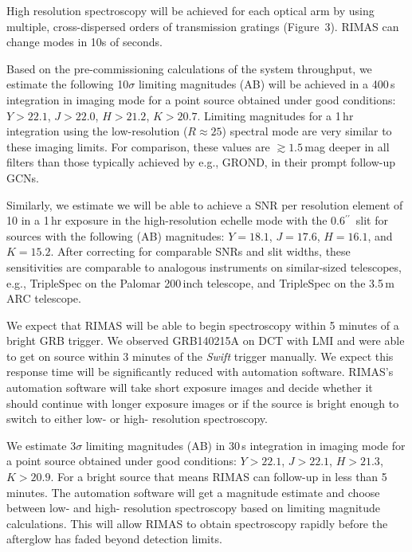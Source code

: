 \documentclass[letterpaper,11pt]{article}
\newcommand{\arcsec}{\mbox{$^{\prime\prime}$}}%
\begin{document}
High resolution spectroscopy will be achieved for each optical arm by using 
multiple, cross-dispersed orders of transmission gratings (Figure~3).  RIMAS
can change modes in 10s of seconds.

\smallskip

Based on the pre-commissioning calculations of the system throughput, we estimate 
the following 10$\sigma$ limiting magnitudes (AB) will be achieved in a 400\,s
integration in imaging mode for a point source obtained under good 
conditions: $Y > 22.1$, $J > 22.0$, $H > 21.2$, $K > 20.7$.  Limiting
magnitudes for a 1\,hr integration using the low-resolution ($R \approx 25$)
spectral mode are very similar to these imaging limits.  For comparison, 
these values are $\gtrsim 1.5$\,mag deeper in all filters than those typically 
achieved by e.g., GROND, in their prompt follow-up GCNs.

Similarly, we estimate we will be able to achieve a SNR per resolution element of 
10 in a 1\,hr exposure in the high-resolution echelle mode with the 0.6\arcsec\ 
slit for sources with the following (AB) magnitudes: $Y = 18.1$, $J = 17.6$, 
$H = 16.1$, and $K = 15.2$.  After correcting for comparable SNRs and slit
widths, these sensitivities are comparable to analogous instruments on 
similar-sized telescopes, e.g., TripleSpec on the Palomar 200\,inch telescope, and
TripleSpec on the 3.5\,m ARC telescope.

\smallskip

We expect that RIMAS will be able to begin spectroscopy within 5 minutes of a bright GRB trigger.
We observed GRB140215A on DCT with LMI and were able to get on source 
within 3 minutes of the \textit{Swift} trigger manually.  We expect this response time will be significantly reduced with 
automation software.  RIMAS's automation software will take short exposure images and 
decide whether it should continue with longer exposure images or if the source is bright 
enough to switch to either low- or high- resolution spectroscopy.

We estimate 3$\sigma$ limiting magnitudes (AB) in 30\,s integration 
in imaging mode for a point source obtained under good conditions: 
$Y > 22.1$, $J > 22.1$, $H > 21.3$, $K > 20.9$.  For a bright source that means RIMAS can
follow-up in less than 5 minutes.  The automation software will get a magnitude estimate and 
choose between low- and high- resolution spectroscopy based on limiting magnitude calculations.
This will allow RIMAS to obtain spectroscopy rapidly before the afterglow has faded beyond detection limits.
\end{document}
